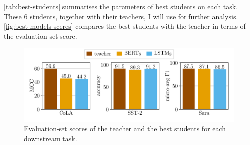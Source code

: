\documentclass[bsc,frontabs,singlespacing,parskip,deptreport]{infthesis}
\begin{document}
{{    \autoref{tab:best-students} summarises the parameters of best students on each task. These 6 students, together with their teachers, I will use for further analysis. \autoref{fig:best-models-scores} compares the best students with the teacher in terms of the evaluation-set score.

    \begin{figure}[h!tb]
      \centering
      \includegraphics[width=13cm]{../experiments/analysis/img/best-models-scores.pdf}
      \caption{Evaluation-set scores of the teacher and the best students for each downstream task.}
      \label{fig:best-models-scores}
    \end{figure}
  }
}
\end{document}
